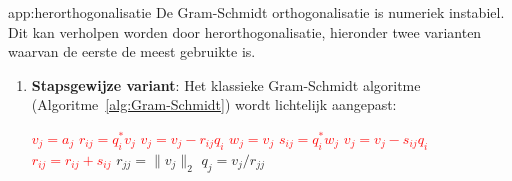 \begin{app}{app:herorthogonalisatie}
    De Gram-Schmidt orthogonalisatie is numeriek instabiel. Dit kan verholpen worden door herorthogonalisatie, hieronder twee varianten waarvan de eerste de meest gebruikte is.
    \begin{enumerate}
        \item \textbf{Stapsgewijze variant}: Het klassieke Gram-Schmidt algoritme (Algoritme~\ref{alg:Gram-Schmidt}) wordt lichtelijk aangepast:
                    \begin{tcolorbox}[colback=white, colframe=gray, arc=0mm] 
                    \begin{algorithmic}[1]
                        \State \textcolor{red}{$v_j = a_j$}
                            \State \textcolor{red}{$r_{ij} = q_i^* v_j$}
                            \State \textcolor{red}{$v_j = v_j - r_{ij} q_i$}
                        \EndFor
                        \State
                        \State \textcolor{red}{$w_j = v_j$}
                            \State \textcolor{red}{$s_{ij} = q_i^* w_j$}
                            \State \textcolor{red}{$v_j = v_j - s_{ij} q_i$}
                            \State \textcolor{red}{$r_{ij} = r_{ij} + s_{ij}$}
                        \EndFor
                        \State
                        \State $r_{jj} = \|v_j\|_2$
                        \State $q_j = v_j / r_{jj}$
                    \EndFor
                    \end{algorithmic}
                \end{tcolorbox}

\end{enumerate}
\end{app}
